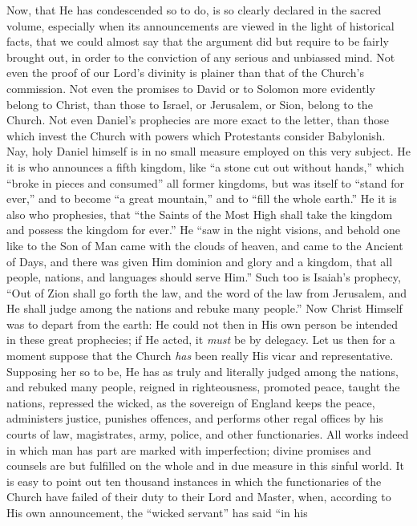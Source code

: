 Now, that He has condescended so to do, is so clearly declared in
the sacred volume, especially when its announcements are viewed in the
light of historical facts, that we could almost say that the argument
did but require to be fairly brought out, in order to the conviction
of any serious and unbiassed mind. Not even the proof of our Lord's
divinity is plainer than that of the Church's commission. Not even the
promises to David or to Solomon more evidently belong to Christ, than
those to Israel, or Jerusalem, or Sion, belong to the Church. Not even
Daniel's prophecies are more exact to the letter, than those which
invest the Church with powers which Protestants consider Babylonish.
Nay, holy Daniel himself is in no small measure employed on this very
subject. He it is who announces a fifth kingdom, like ``a stone
cut out without hands,'' which ``broke in pieces and
consumed'' all former kingdoms, but was itself to ``stand for
ever,'' and to become ``a great mountain,'' and to
``fill the whole earth.'' He it is also who prophesies, that
``the Saints of the Most High shall take the kingdom and possess
the kingdom for ever.'' He ``saw in the night visions, and
behold one like to the Son of Man came with the clouds of heaven, and
came to the Ancient of Days, and there was given Him dominion and
glory and a kingdom, that all people, nations, and languages
should serve Him.'' Such too is Isaiah's prophecy, ``Out of
Zion shall go forth the law, and the word of the law from Jerusalem,
and He shall judge among the nations and rebuke many people.'' Now
Christ Himself was to depart from the earth: He could not then in His
own person be intended in these great prophecies; if He acted, it \emph{must}
be by delegacy. Let us then for a moment suppose that the Church \emph{has}
been really His vicar and representative. Supposing her so to be, He
has as truly and literally judged among the nations, and rebuked many
people, reigned in righteousness, promoted peace, taught the nations,
repressed the wicked, as the sovereign of England keeps the peace,
administers justice, punishes offences, and performs other regal
offices by his courts of law, magistrates, army, police, and other
functionaries. All works indeed in which man has part are marked with
imperfection; divine promises and counsels are but fulfilled on the
whole and in due measure in this sinful world. It is easy to point out
ten thousand instances in which the functionaries of the Church have
failed of their duty to their Lord and Master, when, according to His
own announcement, the ``wicked servant'' has said ``in his
